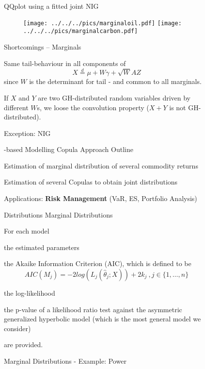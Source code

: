 \begin{figure}[htp]
\begin{center}
QQplot using a fitted joint NIG 
\begin{figure}
\centering{}\texttt{[image: ../../../pics/marginaloil.pdf]}
\texttt{[image: ../../../pics/marginalcarbon.pdf]} 
\end{figure}

\par\end{center}



Shortcomings -- Marginals %


Same tail-behaviour in all components of 
$$
X\stackrel{d}{=}\mu+W\gamma+\sqrt{W}AZ
$$
since $W$ is the determinant for tail - and common to all marginals. 

If $X$ and $Y$ are two GH-distributed random variables driven by
different $W$s, we loose the convolution property ($X+Y$ is not
GH-distributed). 

Exception: NIG 

 \subsectionCopula-based Modelling Copula Approach Outline %


Estimation of marginal distribution of several commodity returns 

Estimation of several Copulas to obtain joint distributions 

Applications: \textbf{Risk Management} (VaR, ES, Portfolio Analysis) 



\subsubsectionMarginal Distributions Marginal Distributions

For each model 

the estimated parameters 

the Akaike Information Criterion (AIC), which is defined to be 
$$
AIC(M_{j})=-2log(L_{j}(\hat{\theta}_{j};X))+2k_{j}\ ,j\in\{1,\ldots,n\}
$$


the log-likelihood 

the p-value of a likelihood ratio test against the asymmetric generalized
hyperbolic model (which is the most general model we consider) 

are provided.



Marginal Distributions - Example: Power




\end{figure}
